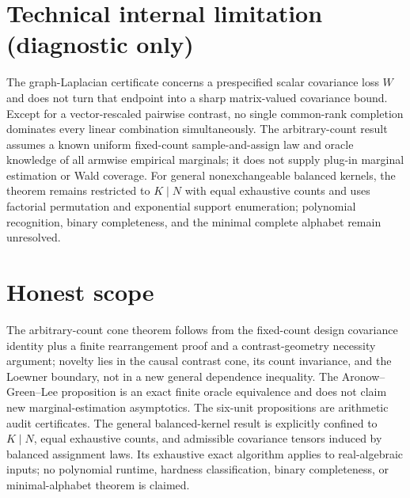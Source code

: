 \documentclass{article}
\begin{document}
\section*{Technical internal limitation (diagnostic only)}

The graph-Laplacian certificate concerns a prespecified scalar covariance loss \(W\) and does not turn that endpoint into a sharp matrix-valued covariance bound.  Except for a vector-rescaled pairwise contrast, no single common-rank completion dominates every linear combination simultaneously.  The arbitrary-count result assumes a known uniform fixed-count sample-and-assign law and oracle knowledge of all armwise empirical marginals; it does not supply plug-in marginal estimation or Wald coverage.  For general nonexchangeable balanced kernels, the theorem remains restricted to \(K\mid N\) with equal exhaustive counts and uses factorial permutation and exponential support enumeration; polynomial recognition, binary completeness, and the minimal complete alphabet remain unresolved.

\section{Honest scope}

The arbitrary-count cone theorem follows from the fixed-count design covariance identity plus a finite rearrangement proof and a contrast-geometry necessity argument; novelty lies in the causal contrast cone, its count invariance, and the Loewner boundary, not in a new general dependence inequality.  The Aronow--Green--Lee proposition is an exact finite oracle equivalence and does not claim new marginal-estimation asymptotics.  The six-unit propositions are arithmetic audit certificates.  The general balanced-kernel result is explicitly confined to \(K\mid N\), equal exhaustive counts, and admissible covariance tensors induced by balanced assignment laws.  Its exhaustive exact algorithm applies to real-algebraic inputs; no polynomial runtime, hardness classification, binary completeness, or minimal-alphabet theorem is claimed.
\end{document}
